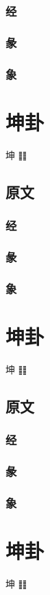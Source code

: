\documentclass[12pt,oneside]{book}
\begin{document}
\subsection{经}
\subsection{彖}
\subsection{象}

\chapter{坤卦}
坤 ䷁

\section{原文}
\subsection{经}
\subsection{彖}
\subsection{象}
\chapter{坤卦}
坤 ䷁

\section{原文}
\subsection{经}
\subsection{彖}
\subsection{象}
\chapter{坤卦}
坤 ䷁
\end{document}
